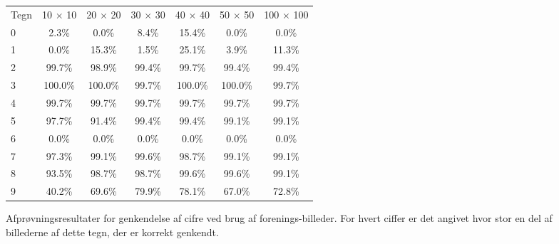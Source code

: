 \begin{figure}[htp]
\centering
\begin{tabular}{|l|c|c|c|c|c|c|}\hline
\rowcolor[gray]{0.9} \multicolumn{7}{|>{\columncolor[gray]{0.9}}c|}{\textbf{Genkendelse af cifre - Forenings-billeder}} \\ \hline
Tegn & 10 $\times$ 10 & 20 $\times$ 20 & 30 $\times$ 30 & 40 $\times$ 40 & 50 $\times$ 50 & 100 $\times$ 100\\\hline
0 & 2.3\% & 0.0\% & 8.4\% & 15.4\% & 0.0\% & 0.0\%\\\hline
1 & 0.0\% & 15.3\% & 1.5\% & 25.1\% & 3.9\% & 11.3\%\\\hline
2 & 99.7\% & 98.9\% & 99.4\% & 99.7\% & 99.4\% & 99.4\%\\\hline
3 & 100.0\% & 100.0\% & 99.7\% & 100.0\% & 100.0\% & 99.7\%\\\hline
4 & 99.7\% & 99.7\% & 99.7\% & 99.7\% & 99.7\% & 99.7\%\\\hline
5 & 97.7\% & 91.4\% & 99.4\% & 99.4\% & 99.1\% & 99.1\%\\\hline
6 & 0.0\% & 0.0\% & 0.0\% & 0.0\% & 0.0\% & 0.0\%\\\hline
7 & 97.3\% & 99.1\% & 99.6\% & 98.7\% & 99.1\% & 99.1\%\\\hline
8 & 93.5\% & 98.7\% & 98.7\% & 99.6\% & 99.6\% & 99.1\%\\\hline
9 & 40.2\% & 69.6\% & 79.9\% & 78.1\% & 67.0\% & 72.8\%\\\hline
\end{tabular}
\caption{Afprøvningsresultater for genkendelse af cifre ved brug af forenings-billeder. For hvert ciffer er det angivet hvor stor en del af billederne af dette tegn, der er korrekt genkendt.}
\label{fig:test:and_tal}
\end{figure}

